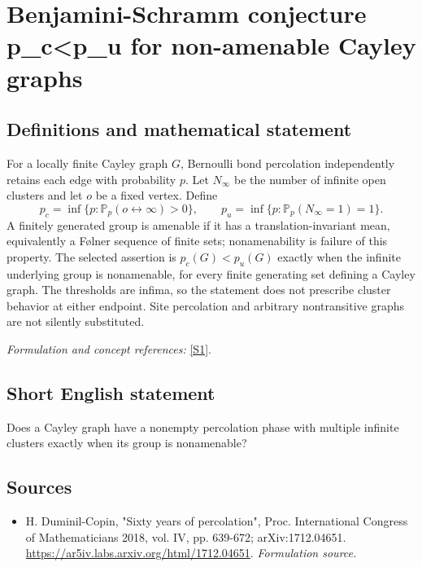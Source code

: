 \documentclass[11pt]{article}
\begin{document}
\section*{\texorpdfstring{Benjamini-Schramm conjecture p\_c<p\_u for non-amenable Cayley graphs}{Benjamini-Schramm conjecture p\_c<p\_u for non-amenable Cayley graphs}}\label{30006884}
\subsection{Definitions and mathematical statement}
For a locally finite Cayley graph $G$, Bernoulli bond percolation independently retains each edge with probability $p$. Let $N_\infty$ be the number of infinite open clusters and let $o$ be a fixed vertex. Define
\[
 p_c=\inf\{p:{\mathbb{P}}_p(o\leftrightarrow\infty)>0\},\qquad
 p_u=\inf\{p:{\mathbb{P}}_p(N_\infty=1)=1\}.
\]
A finitely generated group is amenable if it has a translation-invariant mean, equivalently a F\o lner sequence of finite sets; nonamenability is failure of this property. The selected assertion is $p_c(G)<p_u(G)$ exactly when the infinite underlying group is nonamenable, for every finite generating set defining a Cayley graph. The thresholds are infima, so the statement does not prescribe cluster behavior at either endpoint. Site percolation and arbitrary nontransitive graphs are not silently substituted.
\par\smallskip\textit{Formulation and concept references:} \href{https://ar5iv.labs.arxiv.org/html/1712.04651}{[S1]}.

\subsection{Short English statement}
Does a Cayley graph have a nonempty percolation phase with multiple infinite clusters exactly when its group is nonamenable?
\subsection{Sources}
\begin{itemize}
\item[S1]H. Duminil-Copin, "Sixty years of percolation", Proc. International Congress of Mathematicians 2018, vol. IV, pp. 639-672; arXiv:1712.04651.
\url{https://ar5iv.labs.arxiv.org/html/1712.04651}.
\textit{Formulation source.}
\end{itemize}
\end{document}
